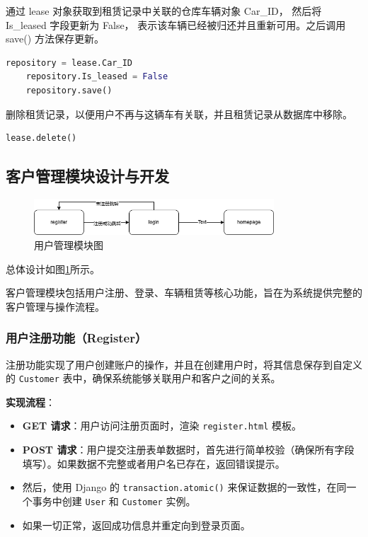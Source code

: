 \documentclass[UTF8,a4paper,12pt]{ctexart}
\begin{document}
通过 lease 对象获取到租赁记录中关联的仓库车辆对象 Car\_ID，
然后将 Is\_leased 字段更新为 False，
表示该车辆已经被归还并且重新可用。之后调用 save() 方法保存更新。

\begin{lstlisting}[language=Python]
    repository = lease.Car_ID
    repository.Is_leased = False  
    repository.save()
\end{lstlisting}

删除租赁记录，以便用户不再与这辆车有关联，并且租赁记录从数据库中移除。

\begin{lstlisting}[language=Python]
    lease.delete()
\end{lstlisting}

\subsection{客户管理模块设计与开发}

\begin{figure}[htbp]  %
    \centering  %
    \includegraphics[width=0.8\textwidth]{pic/user_management.png}
    \caption{用户管理模块图}  %
    \label{fig:um}  %
\end{figure}


总体设计如图\ref{fig:um}所示。

客户管理模块包括用户注册、登录、车辆租赁等核心功能，旨在为系统提供完整的客户管理与操作流程。

\subsubsection{用户注册功能（Register）}
注册功能实现了用户创建账户的操作，并且在创建用户时，将其信息保存到自定义的 \texttt{Customer} 表中，确保系统能够关联用户和客户之间的关系。

\textbf{实现流程}：
\begin{itemize}
    \item \textbf{GET 请求}：用户访问注册页面时，渲染 \texttt{register.html} 模板。
    \item \textbf{POST 请求}：用户提交注册表单数据时，首先进行简单校验（确保所有字段填写）。如果数据不完整或者用户名已存在，返回错误提示。
    \item 然后，使用 Django 的 \texttt{transaction.atomic()} 来保证数据的一致性，在同一个事务中创建 \texttt{User} 和 \texttt{Customer} 实例。
    \item 如果一切正常，返回成功信息并重定向到登录页面。
\end{itemize}
\end{document}
